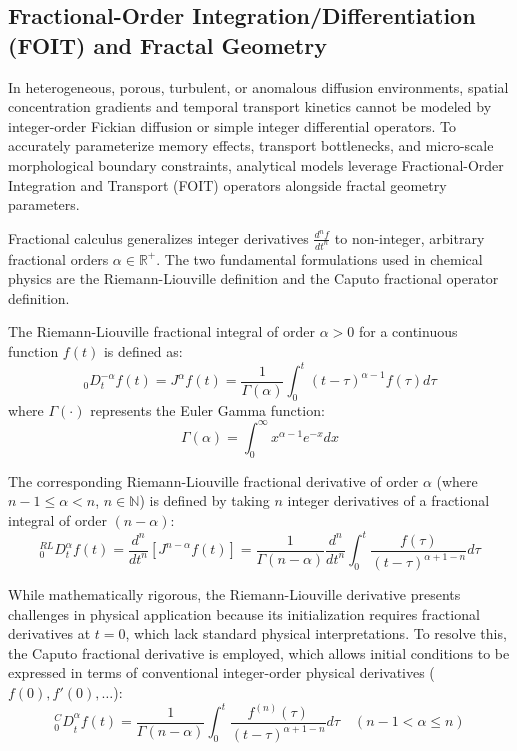\documentclass[12pt]{article}
\begin{document}
\subsection{Fractional-Order Integration/Differentiation (FOIT) and Fractal Geometry}

In heterogeneous, porous, turbulent, or anomalous diffusion environments, spatial concentration gradients and temporal transport kinetics cannot be modeled by integer-order Fickian diffusion or simple integer differential operators. To accurately parameterize memory effects, transport bottlenecks, and micro-scale morphological boundary constraints, analytical models leverage Fractional-Order Integration and Transport (FOIT) operators alongside fractal geometry parameters.

Fractional calculus generalizes integer derivatives $\frac{d^n f}{dt^n}$ to non-integer, arbitrary fractional orders $\alpha \in \mathbb{R}^+$. The two fundamental formulations used in chemical physics are the Riemann-Liouville definition and the Caputo fractional operator definition.

The Riemann-Liouville fractional integral of order $\alpha > 0$ for a continuous function $f(t)$ is defined as:
\begin{equation}
_0 D_t^{-\alpha} f(t) = J^\alpha f(t) = \frac{1}{\Gamma(\alpha)} \int_{0}^{t} (t - \tau)^{\alpha - 1} f(\tau) d\tau
\end{equation}
where $\Gamma(\cdot)$ represents the Euler Gamma function:
\begin{equation}
\Gamma(\alpha) = \int_{0}^{\infty} x^{\alpha - 1} e^{-x} dx
\end{equation}

The corresponding Riemann-Liouville fractional derivative of order $\alpha$ (where $n-1 \le \alpha < n$, $n \in \mathbb{N}$) is defined by taking $n$ integer derivatives of a fractional integral of order $(n - \alpha)$:
\begin{equation}
^{RL}_0 D_t^\alpha f(t) = \frac{d^n}{dt^n} \left[ J^{n-\alpha} f(t) \right] = \frac{1}{\Gamma(n - \alpha)} \frac{d^n}{dt^n} \int_{0}^{t} \frac{f(\tau)}{(t - \tau)^{\alpha + 1 - n}} d\tau
\end{equation}

While mathematically rigorous, the Riemann-Liouville derivative presents challenges in physical application because its initialization requires fractional derivatives at $t = 0$, which lack standard physical interpretations. To resolve this, the Caputo fractional derivative is employed, which allows initial conditions to be expressed in terms of conventional integer-order physical derivatives ($f(0), f'(0), \dots$):
\begin{equation}
{^C_0 D}_t^\alpha f(t) = \frac{1}{\Gamma(n - \alpha)} \int_{0}^{t} \frac{f^{(n)}(\tau)}{(t - \tau)^{\alpha + 1 - n}} d\tau \quad (n-1 < \alpha \le n)
\end{equation}
\end{document}
